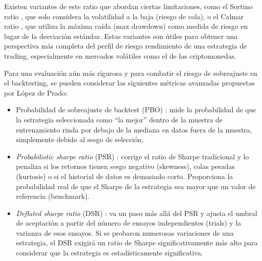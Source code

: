 Existen variantes de este ratio que abordan ciertas limitaciones, como el Sortino ratio \cite{Sortino:1991}, que solo considera la volatilidad a la baja (riesgo de cola), o el Calmar ratio \cite{Young:1991}, que utiliza la máxima caída (max drawdown) como medida de riesgo en lugar de la desviación estándar. Estas variantes son útiles para obtener una perspectiva más completa del perfil de riesgo rendimiento de una estrategia de trading, especialmente en mercados volátiles como el de las criptomonedas.

Para una evaluación aún más rigurosa y para combatir el riesgo de sobreajuste en el backtesting, se pueden considerar las siguientes métricas avanzadas propuestas por López de Prado:
\begin{itemize}
\item Probabilidad de sobreajuste de backtest (PBO) \cite{LoP:2018}: mide la probabilidad de que la estrategia seleccionada como ``la mejor'' dentro de la muestra de entrenamiento rinda por debajo de la mediana en datos fuera de la muestra, simplemente debido al sesgo de selección.
\item 	\textit{Probabilistic sharpe ratio} (PSR) \cite{LoP:2018}: corrige el ratio de Sharpe tradicional y lo penaliza si los retornos tienen sesgo negativo (skewness), colas pesadas (kurtosis) o si el historial de datos es demasiado corto. Proporciona la probabilidad real de que el Sharpe de la estrategia sea mayor que un valor de referencia (benchmark).
\item 	\textit{Deflated sharpe ratio} (DSR) \cite{LoP:2018}: va un paso más allá del PSR y ajusta el umbral de aceptación a partir del número de ensayos independientes (trials) y la varianza de esos ensayos. Si se probaron numerosas variaciones de una estrategia, el DSR exigirá un ratio de Sharpe significativamente más alto para considerar que la estrategia es estadísticamente significativa.
\end{itemize}

